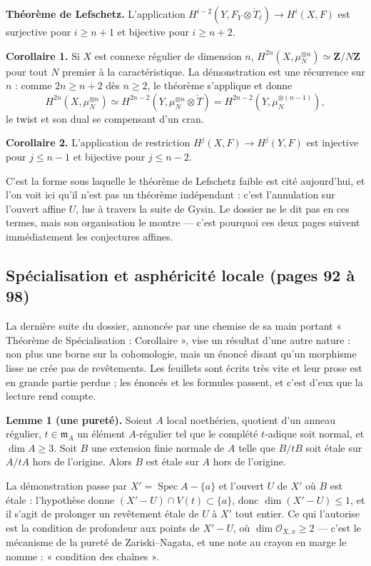 \documentclass[11pt,a4paper]{article}
\begin{document}
\textbf{Théorème de Lefschetz.} L'application
$H^{i-2}(Y, F_Y \otimes \check{T}_{\ell}) \to H^{i}(X,F)$ est surjective pour
$i \geqslant n+1$ et bijective pour $i \geqslant n+2$.

\textbf{Corollaire 1.} Si $X$ est connexe régulier de dimension $n$,
$H^{2n}(X, \mu_N^{\otimes n}) \simeq \mathbf{Z}/N\mathbf{Z}$ pour tout $N$
premier à la caractéristique. La démonstration est une récurrence sur $n$ :
comme $2n \geqslant n+2$ dès $n \geqslant 2$, le théorème s'applique et donne
\[
H^{2n}(X, \mu_N^{\otimes n}) \simeq
H^{2n-2}(Y, \mu_N^{\otimes n} \otimes \check{T}) =
H^{2n-2}(Y, \mu_N^{\otimes (n-1)}),
\]
le twist et son dual se compensant d'un cran.

\textbf{Corollaire 2.} L'application de restriction $H^j(X,F) \to H^j(Y,F)$ est
injective pour $j \leqslant n-1$ et bijective pour $j \leqslant n-2$.

C'est la forme sous laquelle le théorème de Lefschetz faible est cité
aujourd'hui, et l'on voit ici qu'il n'est pas un théorème indépendant : c'est
l'annulation sur l'ouvert affine $U$, lue à travers la suite de Gysin. Le
dossier ne le dit pas en ces termes, mais son organisation le montre — c'est
pourquoi ces deux pages suivent immédiatement les conjectures affines.

\subsection*{Spécialisation et asphéricité locale (pages 92 à 98)}

La dernière suite du dossier, annoncée par une chemise de sa main portant
« Théorème de Spécialisation : Corollaire », vise un résultat d'une autre
nature : non plus une borne sur la cohomologie, mais un énoncé disant qu'un
morphisme lisse ne crée pas de revêtements. Les feuillets sont écrits très vite
et leur prose est en grande partie perdue ; les énoncés et les formules passent,
et c'est d'eux que la lecture rend compte.

\textbf{Lemme 1 (une pureté).} Soient $A$ local noethérien, quotient d'un anneau
régulier, $t \in \mathfrak{m}_A$ un élément $A$-régulier tel que le complété
$t$-adique soit normal, et $\dim A \geqslant 3$. Soit $B$ une extension finie
normale de $A$ telle que $B/tB$ soit étale sur $A/tA$ hors de l'origine. Alors
$B$ est étale sur $A$ hors de l'origine.

La démonstration passe par $X' = \operatorname{Spec} A - \{a\}$ et l'ouvert $U$
de $X'$ où $B$ est étale : l'hypothèse donne
$(X' - U) \cap V(t) \subset \{a\}$, donc $\dim(X' - U) \leqslant 1$, et il
s'agit de prolonger un revêtement étale de $U$ à $X'$ tout entier. Ce qui
l'autorise est la condition de profondeur aux points de $X' - U$, où
$\dim \mathcal{O}_{X,x} \geqslant 2$ — c'est le mécanisme de la pureté de
Zariski--Nagata, et une note au crayon en marge le nomme : « condition des
chaînes ».
\end{document}
